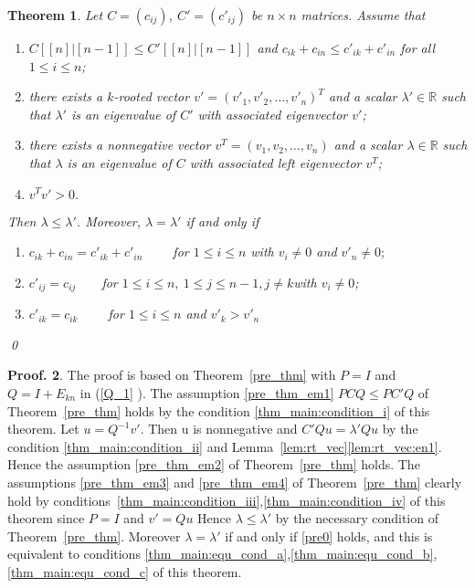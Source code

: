 \documentclass[12pt]{report}
\theoremstyle{plain}
\newtheorem{thm}{Theorem}[chapter]
\theoremstyle{definition}
\newtheorem{pof}[thm]{Proof.}
\begin{document}
\begin{thm} \label{thm_main}
    Let $C=(c_{ij})$, $C'=(c'_{ij})$ be  $n\times n$ matrices.
Assume that
\begin{enumerate}[label=(\Roman*)]
\item \label{thm_main:condition_i} $C[[n]|[n-1]]\leq C'[[n]|[n-1]]$ and $c_{ik}+c_{in}\leq c'_{ik}+c'_{in}$ for all $1\leq i\leq n$;
\item \label{thm_main:condition_ii}there exists a $k$-rooted vector $v'=(v'_1, v'_2, \ldots, v'_n)^T$ and a scalar $\lambda'\in \mathbb{R}$
such that $\lambda'$ is an eigenvalue of $C'$ with associated eigenvector $v'$;
\item there exists a nonnegative vector $v^T=(v_1, v_2, \ldots, v_n)$ and a scalar $\lambda\in \mathbb{R}$ such that $\lambda$ is an eigenvalue of $C$ with associated left eigenvector $v^T$;
\item $v^Tv'>0.$
\end{enumerate}
 Then $\lambda\leq \lambda'$.
Moreover, $\lambda=\lambda'$
if and only if
\begin{enumerate}[label=(\alph*)]
\item  \label{thm_main:equ_cond_a} $c_{ik}+c_{in}=c'_{ik}+c'_{in} \qquad$  for $1\leq i\leq n$ with $v_i\not=0$ and $v'_n\not=0;$
\item \label{thm_main:equ_cond_b} $c'_{ij}=c_{ij}\qquad $for $1\leq i\leq n,~1\leq j\leq n-1, j \neq k $with $v_i\ne 0 $;
\item \label{thm_main:equ_cond_c} $c'_{ik}=c_{ik} \qquad $  for $1\leq i \leq n$ and $ v'_{k}>v'_n$ 
\end{enumerate} \qed
\end{thm}

\begin{pof}
The proof is based on Theorem~\ref{pre_thm} with $P = I$ and $Q = I + E_{kn}$ in (\ref{Q_1} ). 
The assumption \ref{pre_thm_em1} $PCQ\leq PC'Q$ of Theorem~\ref{pre_thm} holds by the condition \ref{thm_main:condition_i} of this theorem. 
Let $u = Q^{-1}v'$. Then u is nonnegative and $C'Qu = \lambda' Qu$ by the condition \ref{thm_main:condition_ii} and
 Lemma~\ref{lem:rt_vec}\ref{lem:rt_vec:en1}. Hence the assumption \ref{pre_thm_em2} of Theorem~\ref{pre_thm} holds. The assumptions \ref{pre_thm_em3} and \ref{pre_thm_em4}
  of Theorem~\ref{pre_thm} clearly hold by conditions~\ref{thm_main:condition_iii},\ref{thm_main:condition_iv} of this theorem since $P = I$ and
   $v'= Qu$  Hence $\lambda \leq \lambda' $ by the necessary condition of Theorem~\ref{pre_thm}. Moreover
    $\lambda = \lambda'$ if and only if \ref{pre0} holds, and this is equivalent to
     conditions \ref{thm_main:equ_cond_a},\ref{thm_main:equ_cond_b},\ref{thm_main:equ_cond_c} of this theorem. 
\end{pof}
\end{document}
